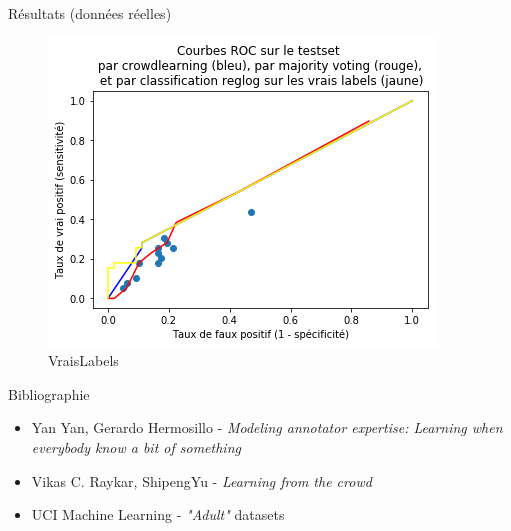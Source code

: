 \documentclass[final]{beamer}
\newlength{\onecolwid}
\begin{document}
\begin{frame}[t]
\begin{columns}[t]
\begin{column}{\onecolwid}
\begin{block}{Résultats (données réelles)}
\begin{minipage}{0.45\textwidth}
    \end{minipage}

    \begin{minipage}{1.49\textwidth}

\begin{figure}
\vspace{-11cm}
    \centering
    \includegraphics[scale=0.85]{DonneesRellesROCTest.png}
    \caption{VraisLabels}
    \label{fig:my_label}
\end{figure}

    \end{minipage}
\end{block}

\vspace{-1cm}
\begin{block}{Bibliographie}

  \begin{minipage}{0.8\textwidth}
    \begin{itemize}
      \small
        \item Yan Yan, Gerardo Hermosillo - \textit{Modeling annotator expertise: Learning when everybody know a bit of something}
        \item Vikas C. Raykar, ShipengYu - \textit{Learning from the crowd}
        \item UCI Machine Learning - \textit{"Adult"} datasets

    \end{itemize}
    \end{minipage}

    \begin{minipage}{1.49\textwidth}


\end{minipage}
\end{block}
\end{column}
\end{columns}
\end{frame}
\end{document}

